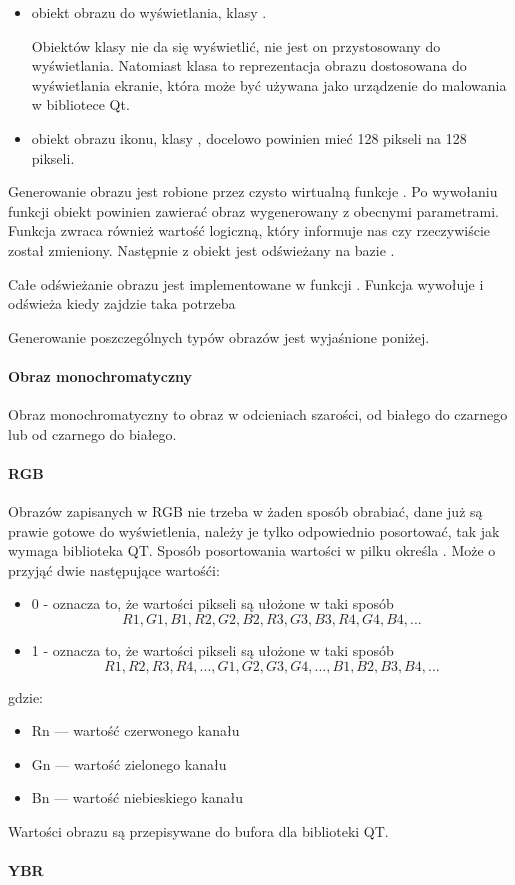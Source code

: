 \begin{itemize}
    \item {} obiekt obrazu do wyświetlania, klasy .

          Obiektów klasy  nie da się wyświetlić, nie jest on przystosowany do wyświetlania.
          Natomiast klasa  to reprezentacja obrazu dostosowana do wyświetlania ekranie, która może być używana jako urządzenie do malowania w bibliotece Qt.

    \item {} obiekt obrazu ikonu, klasy , docelowo powinien mieć 128 pikseli na 128 pikseli.

\end{itemize}

Generowanie obrazu jest robione przez czysto wirtualną funkcje .
Po wywołaniu funkcji obiekt  powinien zawierać obraz wygenerowany z obecnymi parametrami.
Funkcja zwraca również wartość logiczną, który informuje nas czy  rzeczywiście został zmieniony.
Następnie z obiekt  jest odświeżany na bazie .

Całe odświeżanie obrazu jest implementowane w funkcji .
Funkcja wywołuje  i odświeża  kiedy zajdzie taka potrzeba

Generowanie poszczególnych typów obrazów jest wyjaśnione poniżej.


\paragraph{Obraz monochromatyczny}
Obraz monochromatyczny to obraz w odcieniach szarości, od białego do czarnego lub od czarnego do białego.

\paragraph{RGB}
Obrazów zapisanych w RGB nie trzeba w żaden sposób obrabiać, dane już są prawie gotowe do wyświetlenia, należy je tylko odpowiednio posortować, tak jak wymaga biblioteka QT.
Sposób posortowania wartości w pilku określa . Może o przyjąć dwie następujące wartośći:

\begin{itemize}
    \item 0 - oznacza to, że wartości pikseli są ułożone w taki sposób
        \[R1, G1, B1, R2, G2, B2, R3, G3, B3, R4, G4, B4,  ...\]
    \item 1 - oznacza to, że wartości pikseli są ułożone w taki sposób
        \[R1, R2, R3, R4, ... , G1, G2, G3, G4, ..., B1, B2, B3, B4, ...\]
\end{itemize}
gdzie:
\begin{itemize}
    \item Rn --- wartość czerwonego kanału
    \item Gn --- wartość zielonego kanału
    \item Bn --- wartość niebieskiego kanału
\end{itemize}

Wartości obrazu są przepisywane do bufora dla biblioteki QT.


\paragraph{YBR}
